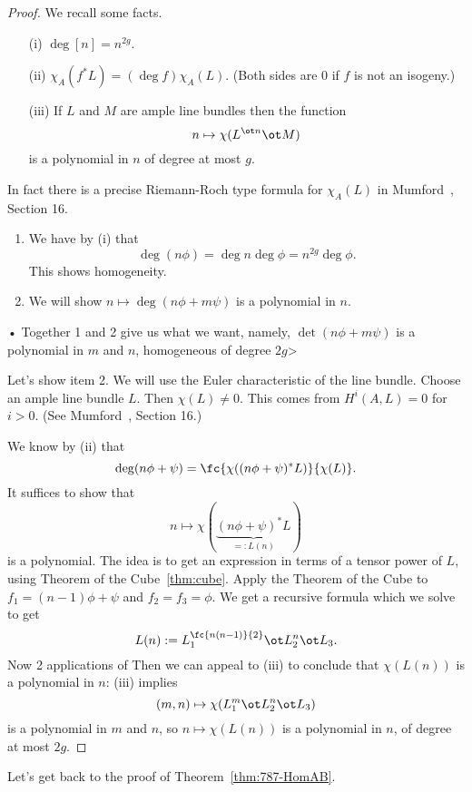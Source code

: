 \begin{proof}
We recall some facts.
\begin{enumerate}
\item[(i)]
$\deg[n]=n^{2g}$. 
\item[(ii)]
$\chi_A(f^*L)=(\deg f)\chi_A(L)$. (Both sides are 0 if $f$ is not an isogeny.)
\item[(iii)]
If $L$ and $M$ are ample line bundles then the function
\[
n\mapsto \chi(L^{\ot n}\ot M)
\]
is a polynomial in $n$ of degree at most $g$.
\end{enumerate}
In fact there is a precise Riemann-Roch type formula for $\chi_A(L)$ in Mumford~\cite{Mu70}, Section 16.

\begin{enumerate}
\item
We have  by (i) that
\[
\deg(n\phi)=\deg n\deg \phi=n^{2g}\deg \phi.
\]
This shows homogeneity.
\item
We will show $n\mapsto \deg (n\phi+m\psi)$ is a polynomial in $n$.
\end{enumerate}•
Together 1 and 2 give us what we want, namely, $\det(n\phi+m\psi)$ is a polynomial in $m$ and $n$, homogeneous of degree $2g$>

Let's show item 2. We will use the Euler characteristic of the line bundle. Choose an ample line bundle $L$. Then $\chi(L)\ne 0$. This comes from $H^i(A,L)=0$ for $i>0$. (See Mumford~\cite{Mu70}, Section 16.) 

We know by (ii) that
\[
\deg(n\phi+\psi)=\fc{\chi((n\phi+\psi)^* L)}{\chi(L)}.
\] 
It suffices to show that 
\[
n\mapsto \chi(\underbrace{(n\phi+\psi)^*L}_{=:L(n)})
\]
is a polynomial.
The idea is to get an expression in terms of a tensor power of $L$, using Theorem of the Cube~\ref{thm:cube}. Apply the Theorem of the Cube to $f_1=(n-1)\phi+\psi$ and $f_2=f_3=\phi$. We get a recursive formula which we solve to get
\[
L(n):=L_1^{\fc{n(n-1)}{2}}\ot L_2^n\ot L_3.
\]
Now 2 applications of 
Then we can appeal to (iii) to conclude that $\chi(L(n))$ is a polynomial in $n$: (iii) implies
\[
(m,n)\mapsto \chi(L_1^m\ot L_2^n \ot L_3)
\]
is a polynomial in $m$ and $n$, so $n\mapsto \chi(L(n))$ is a polynomial in $n$, of degree at most $2g$. 
\end{proof}
Let's get back to the proof of Theorem~\ref{thm:787-HomAB}.

